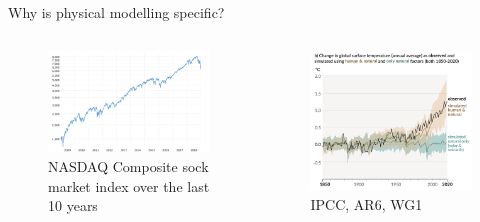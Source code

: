 \documentclass[handout]{beamer}
\begin{document}
\begin{frame}{Why is physical modelling specific?}

\begin{columns}


\begin{figure}
    \caption*{NASDAQ Composite sock market index over the last 10 years}
    \includegraphics[width=\textwidth]{fig/L1/nasdaq-composite-index-10-year-daily-chart-2019-01-09-macrotrends.png}
\end{figure}

\begin{figure}
\caption{IPCC, AR6, WG1}

    \includegraphics[width=\textwidth]{fig/L1/IPPC_temp.png}
\end{figure}

\end{columns}
    
\end{frame}
\end{document}
